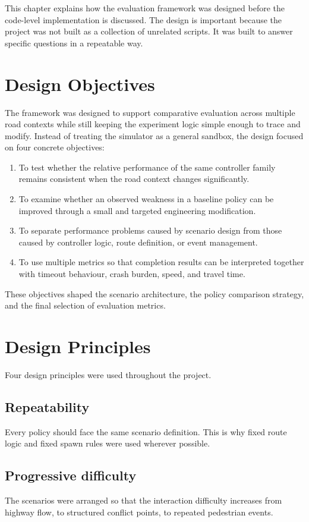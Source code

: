 \documentclass[12pt,a4paper]{report}
\begin{document}
This chapter explains how the evaluation framework was designed before the code-level implementation is discussed. The design is important because the project was not built as a collection of unrelated scripts. It was built to answer specific questions in a repeatable way.

\section{Design Objectives}
The framework was designed to support comparative evaluation across multiple road contexts while still keeping the experiment logic simple enough to trace and modify. Instead of treating the simulator as a general sandbox, the design focused on four concrete objectives:

\begin{enumerate}[label=\arabic*.]
    \item To test whether the relative performance of the same controller family remains consistent when the road context changes significantly.
    \item To examine whether an observed weakness in a baseline policy can be improved through a small and targeted engineering modification.
    \item To separate performance problems caused by scenario design from those caused by controller logic, route definition, or event management.
    \item To use multiple metrics so that completion results can be interpreted together with timeout behaviour, crash burden, speed, and travel time.
\end{enumerate}

These objectives shaped the scenario architecture, the policy comparison strategy, and the final selection of evaluation metrics.

\section{Design Principles}
Four design principles were used throughout the project.

\subsection*{Repeatability}
Every policy should face the same scenario definition. This is why fixed route logic and fixed spawn rules were used wherever possible.

\subsection*{Progressive difficulty}
The scenarios were arranged so that the interaction difficulty increases from highway flow, to structured conflict points, to repeated pedestrian events.
\end{document}
